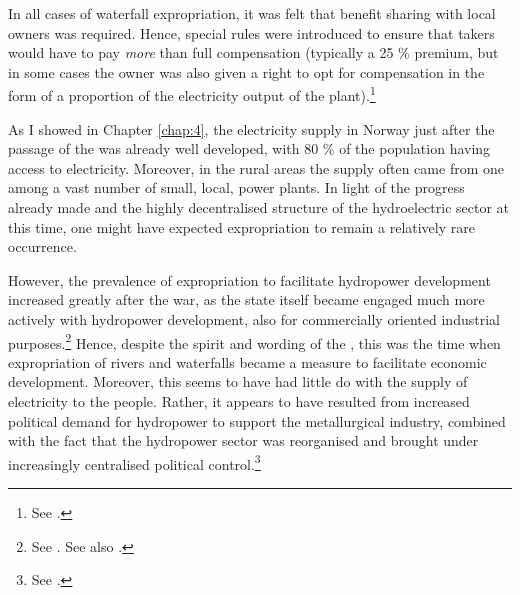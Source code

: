 In all cases of waterfall expropriation, it was felt that benefit sharing with local owners was required. Hence, special rules were introduced to ensure that takers would have to pay {\it more} than full compensation (typically a 25 \% premium, but in some cases the owner was also given a right to opt for compensation in the form of a proportion of the electricity output of the plant).\footnote{See \cite[70-91,184,210]{sorensen41}.}

As I showed in Chapter \ref{chap:4}, the electricity supply in Norway just after the passage of the \cite{wra40} was already well developed, with 80 \% of the population having access to electricity. Moreover, in the rural areas the supply often came from one among a vast number of small, local, power plants. In light of the progress already made and the highly decentralised structure of the hydroelectric sector at this time, one might have expected expropriation to remain a relatively rare occurrence.

However, the prevalence of expropriation to facilitate hydropower development increased greatly after the war, as the state itself became engaged much more actively with hydropower development, also for commercially oriented industrial purposes.\footnote{See \cite[59-71]{thue96}. See also \cite{skjold06}.} Hence, despite the spirit and wording of the \cite{wra40}, this was the time when expropriation of rivers and waterfalls became a measure to facilitate economic development. Moreover, this seems to have had little do with the supply of electricity to the people. Rather, it appears to have resulted from increased political demand for hydropower to support the metallurgical industry, combined with the fact that the hydropower sector was reorganised and brought under increasingly centralised political control.\footnote{See \cite[69-71]{thue96}.} %

